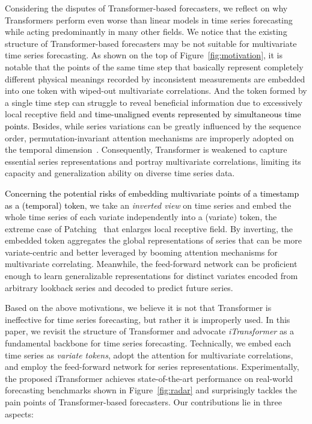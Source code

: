 \documentclass[twoside,12pt]{article}
\newcommand{\update}[1]{{\textcolor{black}{#1}}}
\begin{document}
Considering the disputes of Transformer-based forecasters, we reflect on why Transformers perform even worse than linear models in time series forecasting while acting predominantly in many other fields. We notice that the existing structure of Transformer-based forecasters may be not suitable for multivariate time series forecasting. As shown on the top of Figure~\ref{fig:motivation}, it is notable that the points of the same time step that basically represent completely different physical meanings recorded by inconsistent measurements are embedded into one token with wiped-out multivariate correlations. And the token formed by a single time step can struggle to reveal beneficial information due to excessively local receptive field and \update{time-unaligned events represented by simultaneous time points}. Besides, while series variations can be greatly influenced by the sequence order, permutation-invariant attention mechanisms are improperly adopted on the temporal dimension~\citep{DLinear}. Consequently, Transformer is weakened to capture essential series representations and portray multivariate correlations, limiting its capacity and generalization ability on diverse time series data.


\update{Concerning the potential risks of embedding multivariate points of a timestamp as a (temporal) token}, we take an \emph{inverted view} on time series and embed the whole time series of each variate independently into a (variate) token, the extreme case of Patching~\citep{PatchTST} that enlarges local receptive field. By inverting, the embedded token aggregates the global representations of series that can be more variate-centric and better leveraged by booming attention mechanisms for multivariate correlating. Meanwhile, the feed-forward network can be proficient enough to learn generalizable representations for distinct variates encoded from arbitrary lookback series and decoded to predict future series.

Based on the above motivations, we believe it is not that Transformer is ineffective for time series forecasting, but rather it is improperly used. In this paper, we revisit the structure of Transformer and advocate \emph{iTransformer} as a fundamental backbone for time series forecasting. Technically, we embed each time series as \emph{variate tokens}, adopt the attention for multivariate correlations, and employ the feed-forward network for series representations. Experimentally, the proposed iTransformer achieves state-of-the-art performance on real-world forecasting benchmarks shown in Figure~\ref{fig:radar} and surprisingly tackles the pain points of  Transformer-based forecasters. Our contributions lie in three aspects:
\end{document}
